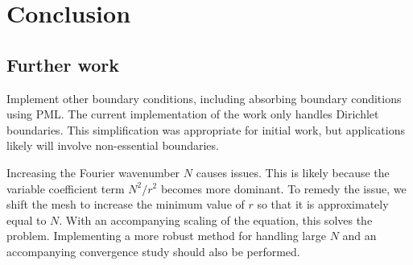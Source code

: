\chapter{Conclusion}






\section{Further work}

Implement other boundary conditions, including absorbing boundary conditions using PML.
The current implementation of the work only handles Dirichlet boundaries.
This simplification was appropriate for initial work, but applications likely will involve non-essential boundaries.

Increasing the Fourier wavenumber $N$ causes issues.
This is likely because the variable coefficient term $N^2/r^2$ becomes more dominant.
To remedy the issue, we shift the mesh to increase the minimum value of $r$ so that it is approximately equal to $N$.
With an accompanying scaling of the equation, this solves the problem.
Implementing a more robust method for handling large $N$ and an accompanying convergence study should also be performed.

